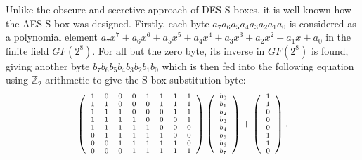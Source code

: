 Unlike the obscure and secretive approach of DES S-boxes, it is well-known
how the AES S-box was designed. Firstly, each byte $a_7a_6a_5a_4a_3a_2a_1a_0$
is considered as a polynomial element
$a_7x^7+a_6x^6+a_5x^5+a_4x^4+a_3x^3+a_2x^2+a_1x+a_0$
in the finite field $GF(2^8)$. For all but the zero byte, its inverse
in $GF(2^8)$ is found, giving another byte $b_7b_6b_5b_4b_3b_2b_1b_0$ which
is then fed into the following equation using $\mathbb{Z}_2$ arithmetic
to give the S-box substitution byte:
\begin{displaymath}\begin{scriptsize}
  \left(\begin{array}{cccccccc}
    1&0&0&0&1&1&1&1\\
    1&1&0&0&0&1&1&1\\
    1&1&1&0&0&0&1&1\\
    1&1&1&1&0&0&0&1\\
    1&1&1&1&1&0&0&0\\
    0&1&1&1&1&1&0&0\\
    0&0&1&1&1&1&1&0\\
    0&0&0&1&1&1&1&1
  \end{array}\right)
  \left(\begin{array}{c}
    b_0\\b_1\\b_2\\b_3\\b_4\\b_5\\b_6\\b_7
  \end{array}\right)
  +
  \left(\begin{array}{c}
    1\\1\\0\\0\\0\\1\\1\\0
  \end{array}\right).
\end{scriptsize}\end{displaymath}

